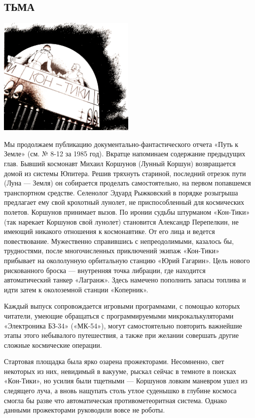 \documentclass[11pt,a4paper,oneside]{article}
\begin{document}
\subsection{ТЬМА}
\label{darkness}

\includegraphics[width=0.5\textwidth]{darkness}

Мы продолжаем публикацию документально-фантастического отчета «Путь к Земле» (см. № 8-12 за 1985 год). Вкратце напоминаем содержание предыдущих глав. Бывший космонавт Михаил Коршунов (Лунный Коршун) возвращается домой из системы Юпитера. Решив тряхнуть стариной, последний отрезок пути (Луна — Земля) он собирается проделать самостоятельно, на первом попавшемся транспортном средстве. Селенолог Эдуард Рыжковский в порядке розыгрыша предлагает ему свой крохотный лунолет, не приспособленный для космических полетов. Коршунов принимает вызов. По иронии судьбы штурманом «Кон-Тики» (так нарекает Коршунов свой лунолет) становится Александр Перепелкин, не имеющий никакого отношения к космонавтике. От его лица и ведется повествование. Мужественно справившись с непреодолимыми, казалось бы, трудностями, после многочисленных приключений экипаж «Кон-Тики» прибывает на окололунную орбитальную станцию «Юрий Гагарин». Цель нового рискованного броска — внутренняя точка либрации, где находится автоматический танкер «Лагранж». Здесь намечено пополнить запасы топлива и идти затем к околоземной станции «Коперник».

Каждый выпуск сопровождается игровыми программами, с помощью которых читатели, умеющие обращаться с программируемыми микрокалькуляторами «Электроника БЗ-34» («МК-54»), могут самостоятельно повторить важнейшие этапы этого небывалого путешествия, а также при желании совершать другие сложные космические операции.

Стартовая площадка была ярко озарена прожекторами. Несомненно, свет некоторых из них, невидимый в вакууме, рыскал сейчас в темноте в поисках «Кон-Тики», но усилия были тщетными — Коршунов ловким маневром ушел из следящего луча, а вновь нащупать столь утлое суденышко в глубине космоса смогла бы разве что автоматическая противометеоритная система. Однако данными прожекторами руководили вовсе не роботы.
\end{document}
